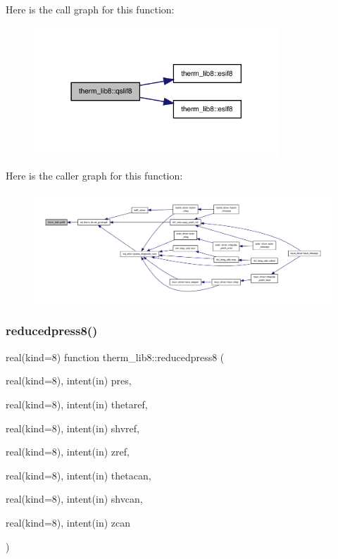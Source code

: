 Here is the call graph for this function\+:
\nopagebreak
\begin{figure}[H]
\begin{center}
\leavevmode
\includegraphics[width=261pt]{namespacetherm__lib8_aa9d6ede67f0021ccc80049f582b3177b_cgraph}
\end{center}
\end{figure}
Here is the caller graph for this function\+:
\nopagebreak
\begin{figure}[H]
\begin{center}
\leavevmode
\includegraphics[width=350pt]{namespacetherm__lib8_aa9d6ede67f0021ccc80049f582b3177b_icgraph}
\end{center}
\end{figure}
\mbox{\label{namespacetherm__lib8_ad325dbfaa9ff36bd492b23150ffd2dc0}} 
\subsubsection{\texorpdfstring{reducedpress8()}{reducedpress8()}}
{\footnotesize\ttfamily real(kind=8) function therm\+\_\+lib8\+::reducedpress8 (\begin{DoxyParamCaption}\item[{real(kind=8), intent(in)}]{pres,  }\item[{real(kind=8), intent(in)}]{thetaref,  }\item[{real(kind=8), intent(in)}]{shvref,  }\item[{real(kind=8), intent(in)}]{zref,  }\item[{real(kind=8), intent(in)}]{thetacan,  }\item[{real(kind=8), intent(in)}]{shvcan,  }\item[{real(kind=8), intent(in)}]{zcan }\end{DoxyParamCaption})}

